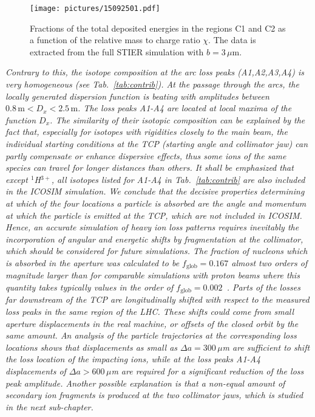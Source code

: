 \begin{figure}[b]
\centering
 \texttt{[image: pictures/15092501.pdf]}

\caption{Fractions of the total deposited energies in the regions C1 and C2 as a function of the relative mass to charge ratio $\chi$. The data is extracted from the full STIER simulation with $b=3\,\mu$m.}
\label{fig:15032102}
\end{figure}

\textit{Contrary to this, the isotope composition at the arc loss peaks (A1,A2,A3,A4) is very homogeneous (see Tab.~\ref{tab:contrib}). At the passage through the arcs, the locally generated dispersion function is beating with amplitudes between $0.8\,\text{m} < D_x < 2.5\,\text{m}$. The loss peaks A1-A4 are located at local maxima of the function $D_x$. The similarity of their isotopic composition can be explained by the fact that, especially for isotopes with rigidities closely to the main beam, the individual starting conditions at the TCP (starting angle and collimator jaw) can partly compensate or enhance dispersive effects, thus some ions of the same species can travel for longer distances than others. It shall be emphasized that except $^1$H$^{3+}$, all isotopes listed for A1-A4 in Tab.~\ref{tab:contrib} are also included in the ICOSIM simulation. We conclude that the decisive properties determining at which of the four locations a particle is absorbed are the angle and momentum at which the particle is emitted at the TCP, which are not included in ICOSIM. Hence, an accurate simulation of heavy ion loss patterns requires inevitably the incorporation of angular and energetic shifts by fragmentation at the collimator, which should be considered for future simulations.
%
The fraction of nucleons which is absorbed in the aperture was calculated to be $f_\text{glob}=0.167$ almost two orders of magnitude larger than for comparable simulations with proton beams where this quantity takes typically values in the order of $f_\text{glob}=0.002$~\cite{Bruce2014a}.
%
Parts of the losses far downstream of the TCP are longitudinally shifted with respect to the measured loss peaks in the same region of the LHC. These shifts could come from small aperture displacements in the real machine, or offsets of the closed orbit by the same amount. An analysis of the particle trajectories at the corresponding loss locations shows that displacements as small as $\Delta a =300\,\mu$m are sufficient to shift the loss location of the impacting ions, while at the loss peaks A1-A4 displacements of $\Delta a > 600\,\mu$m are required for a significant reduction of the loss peak amplitude. Another possible explanation is that a non-equal amount of secondary ion fragments is produced at the two collimator jaws, which is studied in the next sub-chapter.}

